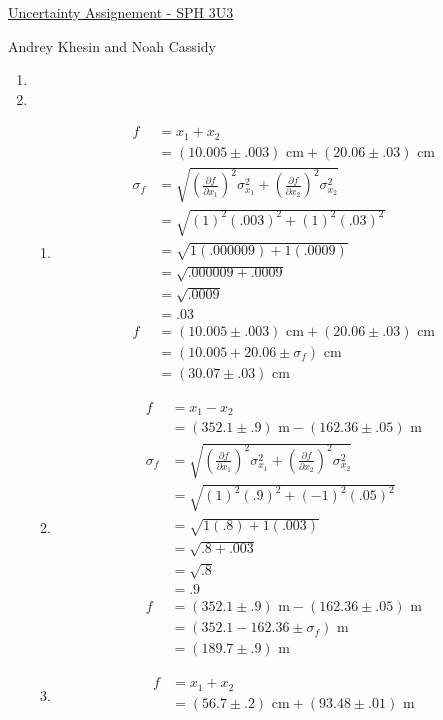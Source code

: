 \documentclass{article}
\begin{document}
\centerline{\sc \large \underline{Uncertainty Assignement - SPH 3U3}}
\centerline{\sc Andrey Khesin and Noah Cassidy}
\centerline{}

\begin{enumerate}
\item 
\item
\begin{enumerate}
\item
\begin{align*}
f &= x_{1} + x_{2}\\
&= (10.005 \pm .003)\text{ cm} + (20.06 \pm .03)\text{ cm}\\
\sigma_{f} &= \sqrt{(\frac{\partial f}{\partial x_{1}})^2\sigma_{x_{1}}^2 + (\frac{\partial f}{\partial x_{2}})^2\sigma_{x_{2}}^2}\\
&= \sqrt{(1)^2(.003)^2 + (1)^2(.03)^2}\\
&= \sqrt{1(.000009) + 1(.0009)}\\
&= \sqrt{.000009 + .0009}\\
&= \sqrt{.0009}\\
&= .03\\
f &= (10.005 \pm .003)\text{ cm} + (20.06 \pm .03)\text{ cm}\\
&= (10.005 + 20.06 \pm \sigma_{f})\text{ cm}\\
&= (30.07 \pm .03)\text{ cm}
\end{align*}
\item
\begin{align*}
f &= x_{1} - x_{2}\\
&= (352.1 \pm .9)\text{ m} - (162.36 \pm .05)\text{ m}\\
\sigma_{f} &= \sqrt{(\frac{\partial f}{\partial x_{1}})^2\sigma_{x_{1}}^2 + (\frac{\partial f}{\partial x_{2}})^2\sigma_{x_{2}}^2}\\
&= \sqrt{(1)^2(.9)^2 + (-1)^2(.05)^2}\\
&= \sqrt{1(.8) + 1(.003)}\\
&= \sqrt{.8 + .003}\\
&= \sqrt{.8}\\
&= .9\\
f &= (352.1 \pm .9)\text{ m} - (162.36 \pm .05)\text{ m}\\
&= (352.1 - 162.36 \pm \sigma_{f})\text{ m}\\
&= (189.7 \pm .9)\text{ m}
\end{align*}
\item
\begin{align*}
f &= x_{1} + x_{2}\\
&= (56.7 \pm .2)\text{ cm} + (93.48 \pm .01)\text{ m}\\

\end{align*}
\end{enumerate}
\end{enumerate}
\end{document}

